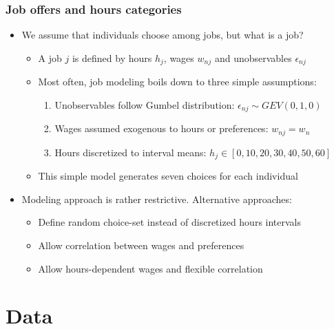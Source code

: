 \documentclass[handout,intlimits]{beamer}
\def\litc#1{\textcolor{med-gray}{\tiny\citep{#1}}}
\def\blue#1{\textcolor{zewblue}{#1}}
\begin{document}
\begin{frame}
\frametitle{Job offers and hours categories}
\begin{itemize}
	\item \blue{We assume that individuals choose among jobs, but what is a job?}
	\begin{itemize}
		\item A job $j$ is defined by hours $h_j$, wages $w_{nj}$ and unobservables $\epsilon_{nj}$
		\smallskip
		\item Most often, job modeling boils down to three simple assumptions:
		\begin{enumerate}
			\item Unobservables follow Gumbel distribution: \blue{$\epsilon_{nj}\sim GEV(0,1,0)$}
			\smallskip
			\item Wages assumed exogenous to hours or preferences: \blue{$w_{nj}=w_n$}
			\smallskip
			\item Hours discretized to interval means: \blue{$h_j\in[0, 10, 20, 30, 40, 50, 60]$}
		\end{enumerate}
		\litc{vansoest_1995, hoynes_1996, keane_moffitt_1998, blundell_etal_2000, bargain_etal_2014}
		\smallskip
		\item This simple model generates seven choices for each individual
	\end{itemize}
	\bigskip
	\item \blue{Modeling approach is rather restrictive.} Alternative approaches:
	\begin{itemize}
		\item Define random choice-set instead of discretized hours intervals \litc{aaberge_etal_2009}
		\smallskip
		\item Allow correlation between wages and preferences \litc{blundell_shephard_2012}
		\smallskip
		\item Allow hours-dependent wages and flexible correlation \litc{loeffler_etal_2014}
	\end{itemize}
\end{itemize}
\end{frame}


\section{Data}
\end{document}
